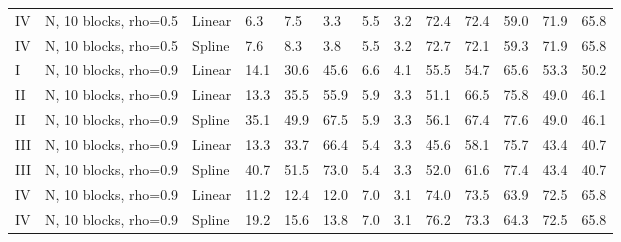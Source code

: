 \documentclass{article}\usepackage[]{graphicx}\usepackage[]{color}
\begin{document}
\begin{table}[ht]
\begin{tabular}{lll|lllll|lllll}
  IV & N, 10 blocks, rho=0.5 & Linear & 6.3 & 7.5 & 3.3 & 5.5 & 3.2 & 72.4 & 72.4 & 59.0 & 71.9 & 65.8 \\ 
  IV & N, 10 blocks, rho=0.5 & Spline & 7.6 & 8.3 & 3.8 & 5.5 & 3.2 & 72.7 & 72.1 & 59.3 & 71.9 & 65.8 \\ 
   \hline
I & N, 10 blocks, rho=0.9 & Linear & 14.1 & 30.6 & 45.6 & 6.6 & 4.1 & 55.5 & 54.7 & 65.6 & 53.3 & 50.2 \\ 
  II & N, 10 blocks, rho=0.9 & Linear & 13.3 & 35.5 & 55.9 & 5.9 & 3.3 & 51.1 & 66.5 & 75.8 & 49.0 & 46.1 \\ 
  II & N, 10 blocks, rho=0.9 & Spline & 35.1 & 49.9 & 67.5 & 5.9 & 3.3 & 56.1 & 67.4 & 77.6 & 49.0 & 46.1 \\ 
  III & N, 10 blocks, rho=0.9 & Linear & 13.3 & 33.7 & 66.4 & 5.4 & 3.3 & 45.6 & 58.1 & 75.7 & 43.4 & 40.7 \\ 
  III & N, 10 blocks, rho=0.9 & Spline & 40.7 & 51.5 & 73.0 & 5.4 & 3.3 & 52.0 & 61.6 & 77.4 & 43.4 & 40.7 \\ 
  IV & N, 10 blocks, rho=0.9 & Linear & 11.2 & 12.4 & 12.0 & 7.0 & 3.1 & 74.0 & 73.5 & 63.9 & 72.5 & 65.8 \\ 
  IV & N, 10 blocks, rho=0.9 & Spline & 19.2 & 15.6 & 13.8 & 7.0 & 3.1 & 76.2 & 73.3 & 64.3 & 72.5 & 65.8 \\ 
   \hline
\end{tabular}
\end{table}
\end{document}
